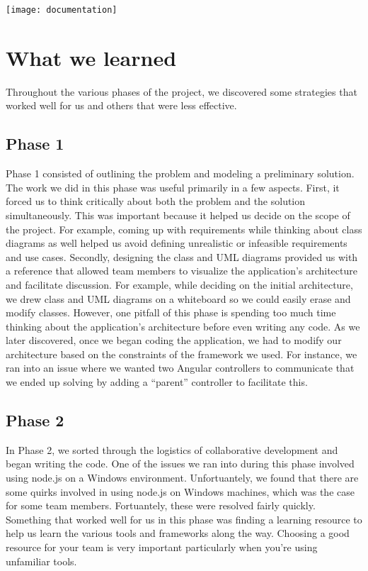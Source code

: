 \documentclass[letterpaper, 12pt]{article}
\begin{document}
  \begin{centering}
  \texttt{[image: documentation]}
    \end{centering}

\section{What we learned}
Throughout the various phases of the project, we discovered some strategies that worked well for us and others that were less effective.

\subsection{Phase 1}
Phase 1 consisted of outlining the problem and modeling a preliminary solution.  The work we did in this phase was useful primarily in a few aspects. First, it forced us to think critically about both the problem and the solution simultaneously.  This was important because it helped us decide on the scope of the project.  For example, coming up with requirements while thinking about class diagrams as well helped us avoid defining unrealistic or infeasible requirements and use cases.  Secondly, designing the class and UML diagrams provided us with a reference that allowed team members to visualize the application's architecture and facilitate discussion. For example, while deciding on the initial architecture, we drew class and UML diagrams on a whiteboard so we could easily erase and modify classes.  However, one pitfall of this phase is spending too much time thinking about the application's architecture before even writing any code.  As we later discovered, once we began coding the application, we had to modify our architecture based on the constraints of the framework we used. For instance, we ran into an issue where we wanted two Angular controllers to communicate that we ended up solving by adding a ``parent'' controller to facilitate this.

\subsection{Phase 2}
In Phase 2, we sorted through the logistics of collaborative development and began writing the code. One of the issues we ran into during this phase involved using node.js on a Windows environment. Unfortuantely, we found that there are some quirks involved in using node.js on Windows machines, which was the case for some team members.  Fortuantely, these were resolved fairly quickly. Something that worked well for us in this phase was finding a learning resource to help us learn the various tools and frameworks along the way. Choosing a good resource for your team is very important particularly when you're using unfamiliar tools.
\end{document}
